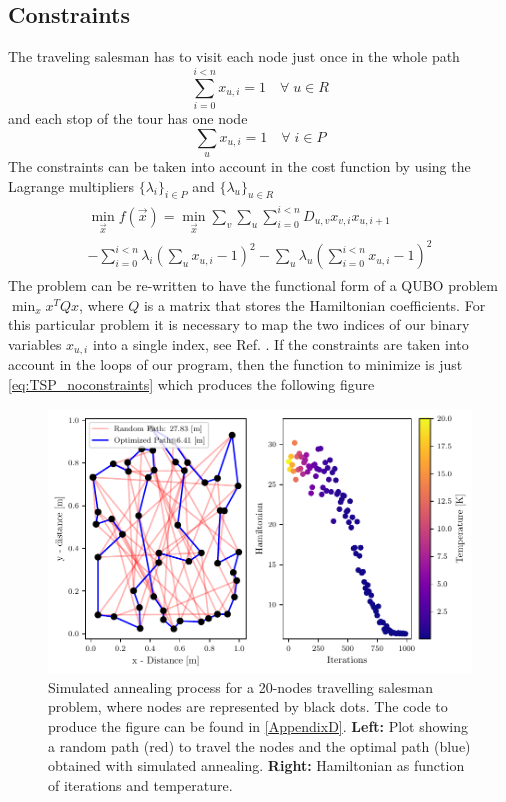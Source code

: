 \subsection{Constraints}
The traveling salesman has to visit each node just once in the whole path
\begin{equation}
    \sum_{i=0}^{i<n}x_{u,i} = 1 \quad  \forall \; u \in R
\end{equation}
and each stop of the tour has one node
\begin{equation}
    \sum_{u}x_{u, i} = 1 \quad  \forall \; i \in P
\end{equation}
The constraints can be taken into account in the cost function by using the Lagrange multipliers $\{\lambda_{i}\}_{i \in P}$ and $\{\lambda_{u}\}_{u \in R}$
\begin{align}
        \label{eq: ObjectiveMatrixFunction}
    \begin{split}
   \min_{\vec{x}} f(\vec{x}) = \min_{\vec{x}} \sum_{v} \sum_{u} \sum_{i=0}^{i<n}D_{u,v}x_{v,i}x_{u, i+1}\\
   - \sum_{i=0}^{i<n}\lambda_{i}\left(\sum_{u} x_{u, i} - 1\right)^{2} - \sum_{u}\lambda_{u} \left( \sum_{i=0}^{i<n}x_{u,i} - 1\right)^{2}
\end{split}
\end{align}
The problem can be re-written to have the functional form of a QUBO problem $\min_{x}x^{T}Qx$, where $Q$ is a matrix that stores the Hamiltonian coefficients. For this particular problem it is necessary to map the two indices of our binary variables $x_{u,i}$ into a single index, see Ref. \cite{Jain2021SolvingComputer}.
If the constraints are taken into account in the loops of our program, then the function to minimize is just \ref{eq:TSP_noconstraints} which produces the following figure
\begin{figure}[H]
    \centering
    \includegraphics[width=\textwidth]{Figures/TSP_SA.pdf}
    \caption{Simulated annealing process for a 20-nodes travelling salesman problem, where nodes are represented by black dots. The code to produce the figure can be found in \ref{AppendixD}.\textbf{ Left:} Plot showing a random path (red) to travel the nodes and the optimal path (blue) obtained with simulated annealing. \textbf{Right:} Hamiltonian as function of iterations and temperature.}
    \label{fig:TSP_SA}
\end{figure}

